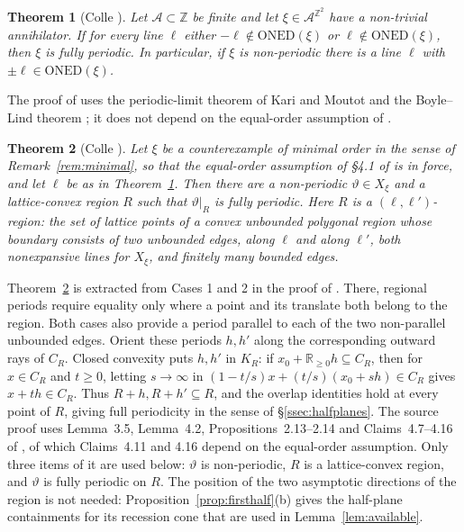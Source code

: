 \documentclass[11pt,reqno]{amsart}
\theoremstyle{plain}
\newtheorem{thm}{Theorem}[section]
\theoremstyle{definition}
\theoremstyle{remark}
\theoremstyle{plain}
\theoremstyle{remark}
\theoremstyle{definition}
\numberwithin{equation}{section}
\newcommand{\R}{\mathbb{R}}
\newcommand{\Z}{\mathbb{Z}}
\newcommand{\cA}{\mathcal{A}}
\begin{document}
\begin{thm}[Colle {\cite[Theorem~1.9]{Colle23a}}]\label{thm:coneed}
Let $\cA\subset\Z$ be finite and let $\xi\in\cA^{\Z^2}$ have a non-trivial
annihilator.  If for every
line $\ell$ either $-\boldsymbol\ell\notin\mathrm{ONED}(\xi)$ or
$\boldsymbol\ell\notin\mathrm{ONED}(\xi)$, then $\xi$ is fully periodic.  In
particular, if $\xi$ is non-periodic there is a line $\ell$ with
$\pm\boldsymbol\ell\in\mathrm{ONED}(\xi)$.
\end{thm}

The proof of \cite[Theorem~1.9]{Colle23a} uses the periodic-limit theorem of
Kari and Moutot \cite{KM20,KM23} and the Boyle--Lind theorem \cite{BoyleLind};
it does not depend on the equal-order assumption of \cite[\S4.1]{Colle23a}.

\begin{thm}[Colle {\cite[proof of Lemma~4.6]{Colle23a}}]\label{thm:colregion}
Let $\xi$ be a counterexample of minimal order in the sense of
Remark~\ref{rem:minimal}, so that the equal-order assumption of \S4.1 of
\cite{Colle23a} is in force, and let $\ell$ be as in
Theorem~\ref{thm:coneed}.  Then there are a non-periodic $\vartheta\in X_\xi$
and a lattice-convex region $R$ such that $\vartheta|_R$ is fully periodic.
Here $R$ is a $(\boldsymbol\ell,\boldsymbol\ell')$-region: the set of lattice
points of a convex unbounded polygonal region whose boundary consists of two
unbounded edges, along $\ell$ and along $\ell'$, both nonexpansive lines for
$X_\xi$, and finitely many bounded edges.
\end{thm}

Theorem~\ref{thm:colregion} is extracted from Cases 1 and 2 in the proof of
\cite[Lemma~4.6]{Colle23a}.  There, regional periods require equality only
where a point and its translate both belong to the region.  Both cases also
provide a period parallel to each of the two non-parallel unbounded edges.
Orient these periods $h,h'$ along the corresponding outward rays of $C_R$.
Closed convexity puts $h,h'$ in $K_R$: if $x_0+\R_{\ge0}h\subseteq C_R$,
then for $x\in C_R$ and $t\ge0$, letting $s\to\infty$ in
$(1-t/s)x+(t/s)(x_0+sh)\in C_R$ gives $x+th\in C_R$.
Thus $R+h,R+h'\subseteq R$, and the overlap identities hold at every point
of $R$, giving full periodicity in the sense of \S\ref{ssec:halfplanes}.
The source proof uses Lemma~3.5, Lemma~4.2, Propositions~2.13--2.14 and
Claims~4.7--4.16 of \cite{Colle23a}, of which Claims~4.11 and 4.16 depend on the
equal-order assumption.  Only three items of it are used below: $\vartheta$ is
non-periodic, $R$ is a lattice-convex region, and $\vartheta$ is fully periodic
on $R$.  The position of the two asymptotic directions of the region is not
needed: Proposition~\ref{prop:firsthalf}(b) gives the half-plane containments
for its recession cone that are used in Lemma~\ref{lem:available}.
\end{document}
